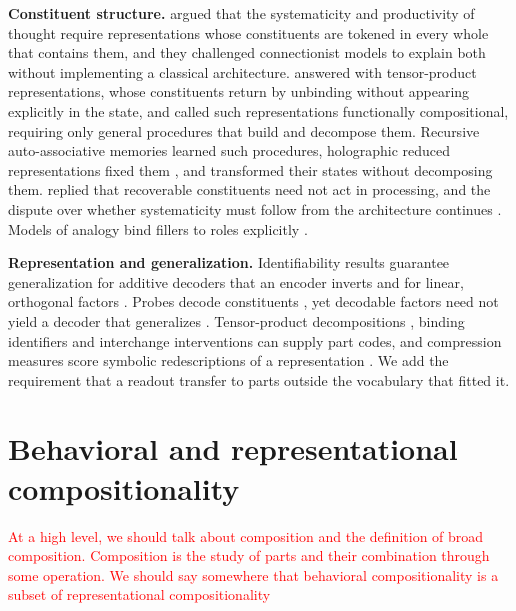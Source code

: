 \documentclass[10pt]{article}
\newcommand{\note}[1]{\textcolor{red}{#1}}
\theoremstyle{plain}
\theoremstyle{remark}
\begin{document}
\textbf{Constituent structure.} \citet{fodor1988} argued that the systematicity and productivity of thought require representations whose constituents are tokened in every whole that contains them, and they challenged connectionist models to explain both without implementing a classical architecture. \citet{smolensky1987,smolensky1990} answered with tensor-product representations, whose constituents return by unbinding without appearing explicitly in the state, and \citet{vangelder1990} called such representations functionally compositional, requiring only general procedures that build and decompose them. Recursive auto-associative memories \citep{pollack1990} learned such procedures, holographic reduced representations fixed them \citep{plate1995}, and \citet{chalmers1990} transformed their states without decomposing them. \citet{fodor1990} replied that recoverable constituents need not act in processing, and the dispute over whether systematicity must follow from the architecture continues \citep{aizawa2003,quiltydunn2023,russin2024,woydt2025,goodale2026}. Models of analogy bind fillers to roles explicitly \citep{hummel1997,doumas2022}.

\textbf{Representation and generalization.} Identifiability results guarantee generalization for additive decoders that an encoder inverts \citep{brady2023,lachapelle2023,wiedemer2024} and for linear, orthogonal factors \citep{uselis2026}. Probes decode constituents \citep{bernardi2020,redhardt2025}, yet decodable factors need not yield a decoder that generalizes \citep{montero2021,schott2022}. Tensor-product decompositions \citep{mccoy2019,soulos2020}, binding identifiers \citep{feng2024} and interchange interventions \citep{geiger2021,geiger2024das} can supply part codes, and compression measures score symbolic redescriptions of a representation \citep{andreas2019,elmoznino2024,elmoznino2026}. We add the requirement that a readout transfer to parts outside the vocabulary that fitted it.

\section{Behavioral and representational compositionality}
\label{sec:definition}

\note{At a high level, we should talk about composition and the definition of broad composition. Composition is the study of parts and their combination through some operation. We should say somewhere that behavioral compositionality is a subset of representational compositionality}
\end{document}
